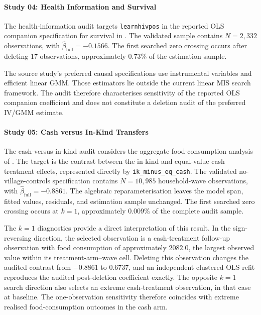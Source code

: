 \documentclass[../main.tex]{subfiles}
\begin{document}
\paragraph*{Study 04: Health Information and Survival}

The health-information audit targets \texttt{learnhivpos} in the reported OLS companion specification for survival in \textcite{ciancio2025surviving}. The validated sample contains \(N=2{,}332\) observations, with \(\widehat{\beta}_{\mathrm{full}}=-0.1566\). The first searched zero crossing occurs after deleting \(17\) observations, approximately \(0.73\%\) of the estimation sample.

The source study's preferred causal specifications use instrumental variables and efficient linear GMM. Those estimators lie outside the current linear MIS search framework. The audit therefore characterises sensitivity of the reported OLS companion coefficient and does not constitute a deletion audit of the preferred IV/GMM estimate.

\paragraph*{Study 05: Cash versus In-Kind Transfers}

The cash-versus-in-kind audit considers the aggregate food-consumption analysis of \textcite{cunha2014testing}. The target is the contrast between the in-kind and equal-value cash treatment effects, represented directly by \texttt{ik\_minus\_eq\_cash}. The validated no-village-controls specification contains \(N=10{,}985\) household-wave observations, with \(\widehat{\beta}_{\mathrm{full}}=-0.8861\). The algebraic reparameterisation leaves the model span, fitted values, residuals, and estimation sample unchanged. The first searched zero crossing occurs at \(k=1\), approximately \(0.009\%\) of the complete audit sample.

The \(k=1\) diagnostics provide a direct interpretation of this result. In the sign-reversing direction, the selected observation is a cash-treatment follow-up observation with food consumption of approximately \(2082.0\), the largest observed value within its treatment-arm--wave cell. Deleting this observation changes the audited contrast from \(-0.8861\) to \(0.6737\), and an independent clustered-OLS refit reproduces the audited post-deletion coefficient exactly. The opposite \(k=1\) search direction also selects an extreme cash-treatment observation, in that case at baseline. The one-observation sensitivity therefore coincides with extreme realised food-consumption outcomes in the cash arm.
\end{document}
